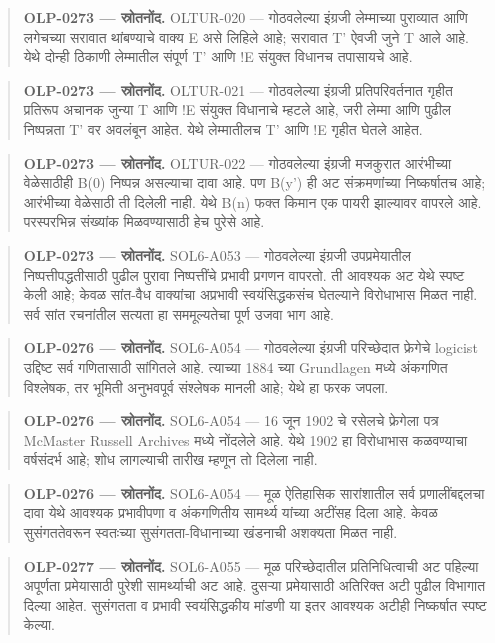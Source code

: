 \begin{quote}\small\textbf{OLP-0273 — स्रोतनोंद.} OLTUR-020 — गोठवलेल्या इंग्रजी लेम्माच्या पुराव्यात आणि लगेचच्या सरावात थांबण्याचे वाक्य E असे लिहिले आहे; सरावात T' ऐवजी जुने T आले आहे. येथे दोन्ही ठिकाणी लेम्मातील संपूर्ण T' आणि {!}E संयुक्त विधानच तपासायचे आहे.\end{quote}
\begin{quote}\small\textbf{OLP-0273 — स्रोतनोंद.} OLTUR-021 — गोठवलेल्या इंग्रजी प्रतिपरिवर्तनात गृहीत प्रतिरूप अचानक जुन्या T आणि {!}E संयुक्त विधानाचे म्हटले आहे, जरी लेम्मा आणि पुढील निष्पन्नता T' वर अवलंबून आहेत. येथे लेम्मातीलच T' आणि {!}E गृहीत घेतले आहेत.\end{quote}
\begin{quote}\small\textbf{OLP-0273 — स्रोतनोंद.} OLTUR-022 — गोठवलेल्या इंग्रजी मजकुरात आरंभीच्या वेळेसाठीही B(0) निष्पन्न असल्याचा दावा आहे. पण B(y') ही अट संक्रमणांच्या निष्कर्षातच आहे; आरंभीच्या वेळेसाठी ती दिलेली नाही. येथे B(n) फक्त किमान एक पायरी झाल्यावर वापरले आहे. परस्परभिन्न संख्यांक मिळवण्यासाठी हेच पुरेसे आहे.\end{quote}
\begin{quote}\small\textbf{OLP-0273 — स्रोतनोंद.} SOL6-A053 — गोठवलेल्या इंग्रजी उपप्रमेयातील निष्पत्तीपद्धतीसाठी पुढील पुरावा निष्पत्तींचे प्रभावी प्रगणन वापरतो. ती आवश्यक अट येथे स्पष्ट केली आहे; केवळ सांत-वैध वाक्यांचा अप्रभावी स्वयंसिद्धकसंच घेतल्याने विरोधाभास मिळत नाही. सर्व सांत रचनांतील सत्यता हा सममूल्यतेचा पूर्ण उजवा भाग आहे.\end{quote}
\begin{quote}\small\textbf{OLP-0276 — स्रोतनोंद.} SOL6-A054 — गोठवलेल्या इंग्रजी परिच्छेदात फ्रेगेचे logicist उद्दिष्ट सर्व गणितासाठी सांगितले आहे. त्याच्या 1884 च्या Grundlagen मध्ये अंकगणित विश्लेषक, तर भूमिती अनुभवपूर्व संश्लेषक मानली आहे; येथे हा फरक जपला.\end{quote}
\begin{quote}\small\textbf{OLP-0276 — स्रोतनोंद.} SOL6-A054 — 16 जून 1902 चे रसेलचे फ्रेगेला पत्र McMaster Russell Archives मध्ये नोंदलेले आहे. येथे 1902 हा विरोधाभास कळवण्याचा वर्षसंदर्भ आहे; शोध लागल्याची तारीख म्हणून तो दिलेला नाही.\end{quote}
\begin{quote}\small\textbf{OLP-0276 — स्रोतनोंद.} SOL6-A054 — मूळ ऐतिहासिक सारांशातील सर्व प्रणालींबद्दलचा दावा येथे आवश्यक प्रभावीपणा व अंकगणितीय सामर्थ्य यांच्या अटींसह दिला आहे. केवळ सुसंगततेवरून स्वतःच्या सुसंगतता-विधानाच्या खंडनाची अशक्यता मिळत नाही.\end{quote}
\begin{quote}\small\textbf{OLP-0277 — स्रोतनोंद.} SOL6-A055 — मूळ परिच्छेदातील प्रतिनिधित्वाची अट पहिल्या अपूर्णता प्रमेयासाठी पुरेशी सामर्थ्याची अट आहे. दुसऱ्या प्रमेयासाठी अतिरिक्त अटी पुढील विभागात दिल्या आहेत. सुसंगतता व प्रभावी स्वयंसिद्धकीय मांडणी या इतर आवश्यक अटीही निष्कर्षात स्पष्ट केल्या.\end{quote}
